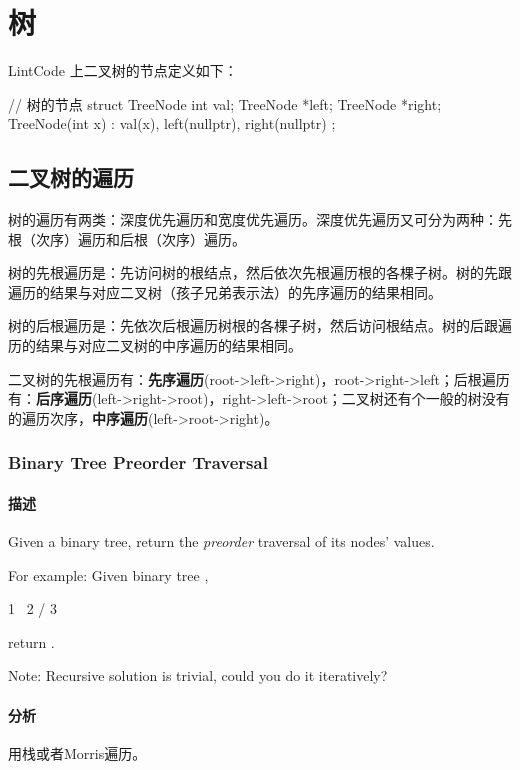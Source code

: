 \chapter{树}

LintCode 上二叉树的节点定义如下：
\begin{Code}
// 树的节点
struct TreeNode {
    int val;
    TreeNode *left;
    TreeNode *right;
    TreeNode(int x) : val(x), left(nullptr), right(nullptr) { }
};
\end{Code}


\section{二叉树的遍历} %

树的遍历有两类：深度优先遍历和宽度优先遍历。深度优先遍历又可分为两种：先根（次序）遍历和后根（次序）遍历。

树的先根遍历是：先访问树的根结点，然后依次先根遍历根的各棵子树。树的先跟遍历的结果与对应二叉树（孩子兄弟表示法）的先序遍历的结果相同。

树的后根遍历是：先依次后根遍历树根的各棵子树，然后访问根结点。树的后跟遍历的结果与对应二叉树的中序遍历的结果相同。

二叉树的先根遍历有：\textbf{先序遍历}(root->left->right)，root->right->left；后根遍历有：\textbf{后序遍历}(left->right->root)，right->left->root；二叉树还有个一般的树没有的遍历次序，\textbf{中序遍历}(left->root->right)。


\subsection{Binary Tree Preorder Traversal}
\label{sec:binary-tree-preorder-traversal}


\subsubsection{描述}
Given a binary tree, return the \emph{preorder} traversal of its nodes' values.

For example:
Given binary tree ,
\begin{Code}
 1
  \
   2
  /
 3
\end{Code}
return \code{[1,2,3]}.

Note: Recursive solution is trivial, could you do it iteratively?


\subsubsection{分析}
用栈或者Morris遍历。



